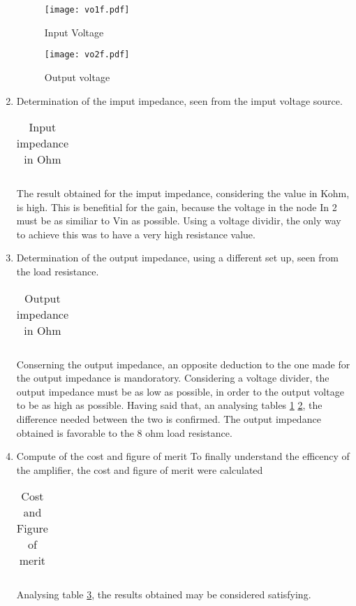 \begin{enumerate}
\begin{figure}[h] \centering
\texttt{[image: vo1f.pdf]}
\caption{Input Voltage}
\label{fig:sim4}
\end{figure}


\begin{figure}[h] \centering
\texttt{[image: vo2f.pdf]}
\caption{Output voltage}
\label{fig:sim5}
\end{figure}




\item Determination of the imput impedance, seen from the imput voltage source.

\begin{table}[h]
  \centering
  \begin{tabular}{|l|r|}
    \hline    
   
   \end{tabular}
  \caption{Input impedance in Ohm}
    \label{tab:ZI}
\end{table}

\par The result obtained for the imput impedance, considering the value in Kohm, is high. This is benefitial for the gain, because the voltage in the node In 2 must be as similiar to Vin as possible. Using a voltage dividir, the only way to achieve this was to have a very high resistance value.

\item Determination of the output impedance, using a different set up, seen from the load resistance. 

\begin{table}[h]
  \centering
  \begin{tabular}{|l|r|}
    \hline    
   
   \end{tabular}
  \caption{Output impedance in Ohm}
  
  \label{tab:ZO}
\end{table}


Conserning the output impedance, an opposite deduction to the one made for the output impedance is mandoratory. Considering a voltage divider, the output impedance must be as low as possible, in order to the output voltage to be as high as possible. Having said that, an analysing tables \ref{tab:ZI} \ref{tab:ZO}, the difference needed between the two is confirmed. The output impedance obtained is favorable to the 8 ohm load resistance.

\item Compute of the cost and figure of merit
To finally understand the efficency of the amplifier, the cost and figure of merit were calculated

\begin{table}[ht]
  \centering
  \begin{tabular}{|l|r|}
    \hline    
   
   \end{tabular}
  \caption{Cost and Figure of merit}
  \label{tab:cost}
\end{table}

Analysing table \ref{tab:cost}, the results obtained may be considered satisfying.


\end{enumerate}



